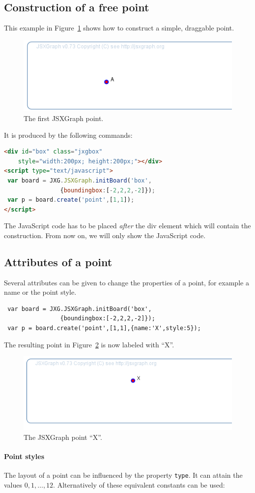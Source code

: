 \subsection{Construction of a free point}
This example in Figure~\ref{fig:2} shows how to construct a simple, draggable point. 
\begin{figure}[htb]
\centerline{\includegraphics[width=0.4\linewidth]{images/b3.png}}
\caption{The first JSXGraph point.}\label{fig:2}
\end{figure}
It is produced by the following commands:
\begin{lstlisting}[language=html]
<div id="box" class="jxgbox" 
    style="width:200px; height:200px;"></div>
<script type="text/javascript">
 var board = JXG.JSXGraph.initBoard('box', 
                {boundingbox:[-2,2,2,-2]});
 var p = board.create('point',[1,1]);
</script>
\end{lstlisting}

The JavaScript code has to be placed {\sl after} the div element which will contain the construction. From now on, we will only show the JavaScript code. 

\subsection{Attributes of a point}
Several attributes can be given to change the properties of a point, for example a name or the point style. 
\begin{lstlisting}
 var board = JXG.JSXGraph.initBoard('box', 
                {boundingbox:[-2,2,2,-2]});
 var p = board.create('point',[1,1],{name:'X',style:5});
\end{lstlisting}
The resulting point in Figure~\ref{fig:3} is now labeled with ``X''.
\begin{figure}[htb]
\centerline{\includegraphics[width=0.4\linewidth]{images/b4.png}}
\caption{The JSXGraph point ``X''.}\label{fig:3}
\end{figure}

\paragraph{Point styles}
The layout of a point can be influenced by the property \lstinline|type|. It can attain the values $0,1,\ldots,12$. 
Alternatively of these equivalent constants can be used:

